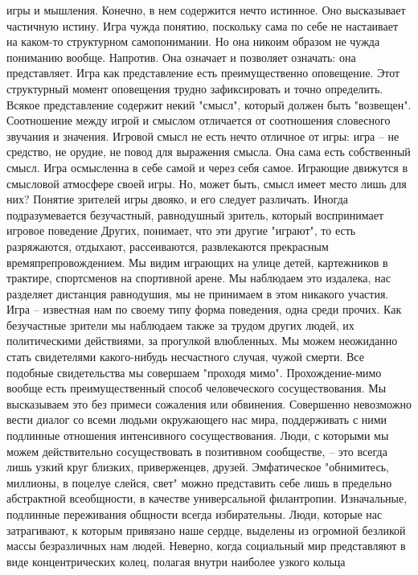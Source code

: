 \documentclass[12pt]{article}
\begin{document}
игры и мышления. Конечно, в нем содержится нечто истинное. Оно высказывает частичную истину. Игра чужда
понятию, поскольку сама по себе не настаивает на каком-то структурном самопонимании. Но она никоим
образом не чужда пониманию вообще. Напротив. Она означает и позволяет означать: она представляет. Игра как
представление  есть  преимущественно  оповещение.  Этот  структурный  момент  оповещения  трудно
зафиксировать  и  точно  определить.  Всякое  представление  содержит  некий  "смысл",  который  должен  быть
"возвещен". Соотношение между игрой и смыслом отличается от соотношения словесного звучания и значения.
Игровой смысл не есть нечто отличное от игры: игра -- не средство, не орудие, не повод для выражения смысла.
Она сама есть собственный смысл. Игра осмысленна в себе самой и через себя самое. Играющие движутся в
смысловой атмосфере своей игры. Но, может быть, смысл имеет место лишь для них?
Понятие зрителей игры двояко, и его следует различать. Иногда подразумевается безучастный, равнодушный
зритель,  который  воспринимает  игровое  поведение  Других,  понимает,  что  эти  другие  "играют",  то  есть
разряжаются,  отдыхают,  рассеиваются,  развлекаются  прекрасным  времяпрепровождением.  Мы  видим
играющих на улице детей, картежников в трактире, спортсменов на спортивной арене. Мы наблюдаем это
издалека, нас разделяет дистанция равнодушия, мы не принимаем в этом никакого участия. Игра -- известная
нам по своему типу форма поведения, одна среди прочих. Как безучастные зрители мы наблюдаем также за
трудом других людей, их политическими действиями, за прогулкой влюбленных. Мы можем неожиданно стать
свидетелями какого-нибудь несчастного случая, чужой смерти. Все подобные свидетельства мы совершаем
"проходя мимо". Прохождение-мимо вообще есть преимущественный способ человеческого сосуществования.
Мы высказываем это без примеси сожаления или обвинения. Совершенно невозможно вести диалог со всеми
людьми окружающего нас мира, поддерживать с ними подлинные отношения интенсивного сосуществования.
Люди, с которыми мы можем действительно сосуществовать в позитивном сообществе, -- это всегда лишь узкий
круг близких, приверженцев, друзей. Эмфатическое "обнимитесь, миллионы, в поцелуе слейся, свет" можно
представить  себе  лишь  в  предельно  абстрактной  всеобщности,  в  качестве  универсальной  филантропии.
Изначальные,  подлинные  переживания  общности  всегда  избирательны.  Люди,  которые  нас  затрагивают,  к
которым привязано наше сердце, выделены из огромной безликой массы безразличных нам людей. Неверно,
когда социальный мир представляют в виде концентрических колец, полагая внутри наиболее узкого кольца
\end{document}
